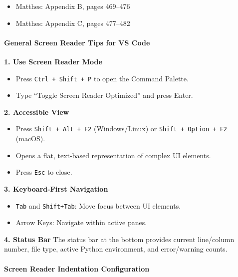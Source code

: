 \documentclass[
  justified,
  openright,
]{tufte-book}
\let\subsubsection\paragraph
\let\paragraph\paragraph
\let\subsubsection\paragraph
\let\paragraph\paragraph
\providecommand{\tightlist}{%
  \setlength{\itemsep}{0pt}\setlength{\parskip}{0pt}}
\begin{document}
\begin{itemize}
\tightlist
\item
  Matthes: Appendix B, pages 469--476
\item
  Matthes: Appendix C, pages 477--482
\end{itemize}

\subsubsection{General Screen Reader Tips for VS
Code}\label{general-screen-reader-tips-for-vs-code}

\textbf{1. Use Screen Reader Mode}

\begin{itemize}
\tightlist
\item
  Press \texttt{Ctrl\ +\ Shift\ +\ P} to open the Command Palette.
\item
  Type ``Toggle Screen Reader Optimized'' and press Enter.
\end{itemize}

\textbf{2. Accessible View}

\begin{itemize}
\tightlist
\item
  Press \texttt{Shift\ +\ Alt\ +\ F2} (Windows/Linux) or
  \texttt{Shift\ +\ Option\ +\ F2} (macOS).
\item
  Opens a flat, text-based representation of complex UI elements.
\item
  Press \texttt{Esc} to close.
\end{itemize}

\textbf{3. Keyboard-First Navigation}

\begin{itemize}
\tightlist
\item
  \texttt{Tab} and \texttt{Shift+Tab}: Move focus between UI elements.
\item
  Arrow Keys: Navigate within active panes.
\end{itemize}

\textbf{4. Status Bar} The status bar at the bottom provides current
line/column number, file type, active Python environment, and
error/warning counts.

\subsubsection{Screen Reader Indentation
Configuration}\label{screen-reader-indentation-configuration}
\end{document}
